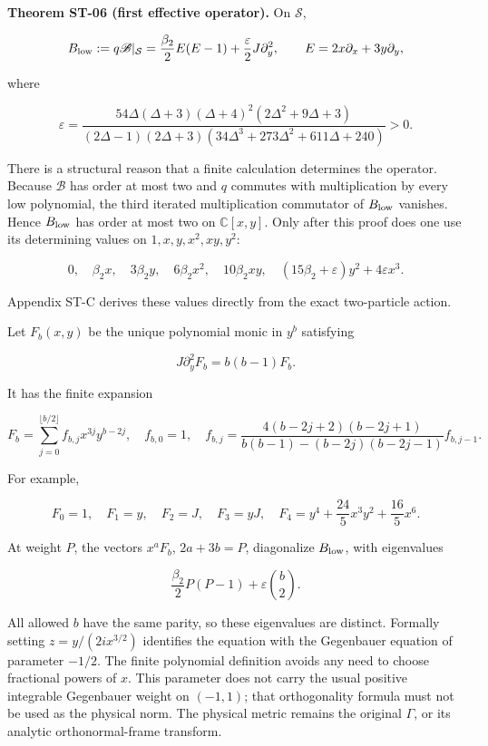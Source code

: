 \textbf{Theorem ST-06 (first effective operator).} On \(\mathcal S\),

\[
B_{\rm low}:=q\mathscr B|_{\mathcal S}
=\frac{\beta_2}{2}E(E-1)+\frac{\varepsilon}{2}J\partial_y^2,
\qquad E=2x\partial_x+3y\partial_y,
\]

where

\[
\varepsilon=
\frac{54\Delta(\Delta+3)(\Delta+4)^2(2\Delta^2+9\Delta+3)}
{(2\Delta-1)(2\Delta+3)(34\Delta^3+273\Delta^2+611\Delta+240)}>0.
\]

There is a structural reason that a finite calculation determines the operator. Because \(\mathscr B\) has order at most two and \(q\) commutes with multiplication by every low polynomial, the third iterated multiplication commutator of \(B_{\rm low}\) vanishes. Hence \(B_{\rm low}\) has order at most two on \(\mathbb C[x,y]\). Only after this proof does one use its determining values on \(1,x,y,x^2,xy,y^2\):

\[
0,\quad\beta_2x,\quad3\beta_2y,\quad
6\beta_2x^2,\quad10\beta_2xy,\quad
(15\beta_2+\varepsilon)y^2+4\varepsilon x^3.
\]

Appendix ST-C derives these values directly from the exact two-particle action.

Let \(F_b(x,y)\) be the unique polynomial monic in \(y^b\) satisfying

\[
J\partial_y^2F_b=b(b-1)F_b.
\]

It has the finite expansion

\[
F_b=\sum_{j=0}^{\lfloor b/2\rfloor}f_{b,j}x^{3j}y^{b-2j},
\quad f_{b,0}=1,\quad
f_{b,j}=
\frac{4(b-2j+2)(b-2j+1)}
{b(b-1)-(b-2j)(b-2j-1)}f_{b,j-1}.
\]

For example,

\[
F_0=1,\quad F_1=y,\quad F_2=J,\quad F_3=yJ,\quad
F_4=y^4+\frac{24}{5}x^3y^2+\frac{16}{5}x^6.
\]

At weight \(P\), the vectors \(x^aF_b\), \(2a+3b=P\), diagonalize \(B_{\rm low}\), with eigenvalues

\[
\frac{\beta_2}{2}P(P-1)+\varepsilon\binom b2.
\]

All allowed \(b\) have the same parity, so these eigenvalues are distinct. Formally setting \(z=y/(2i x^{3/2})\) identifies the equation with the Gegenbauer equation of parameter \textbf{\(-1/2\)}. The finite polynomial definition avoids any need to choose fractional powers of \(x\). This parameter does not carry the usual positive integrable Gegenbauer weight on \((-1,1)\); that orthogonality formula must not be used as the physical norm. The physical metric remains the original \(\Gamma\), or its analytic orthonormal-frame transform.

